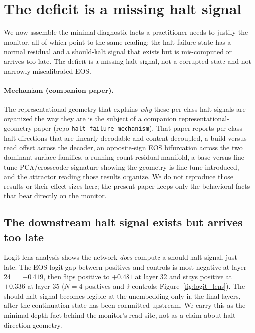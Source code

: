\documentclass[11pt]{article}
\begin{document}
\section{The deficit is a missing halt signal}
\label{sec:missinghalt}

We now assemble the minimal diagnostic facts a practitioner needs to justify the monitor,
all of which point to the same reading: the halt-failure state has a normal residual and a
should-halt signal that exists but is mis-computed or arrives too late. The deficit is a
missing halt signal, not a corrupted state and not narrowly-miscalibrated EOS.

\paragraph{Mechanism (companion paper).}
The representational geometry that explains \emph{why} these per-class halt signals are
organized the way they are is the subject of a companion representational-geometry paper
(repo \texttt{halt-failure-mechanism}). That paper reports per-class halt directions that
are linearly decodable and content-decoupled, a build-versus-read offset across the
decoder, an opposite-sign EOS bifurcation across the two dominant surface families, a
running-count residual manifold, a base-versus-fine-tune PCA/crosscoder signature showing
the geometry is fine-tune-introduced, and the attractor reading those results organize. We
do not reproduce those results or their effect sizes here; the present paper keeps only the
behavioral facts that bear directly on the monitor.

\subsection{The downstream halt signal exists but arrives too late}

Logit-lens analysis shows the network \emph{does} compute a should-halt signal, just late.
The EOS logit gap between positives and controls is most negative at layer 24 $= -0.419$,
then flips positive to $+0.481$ at layer 32 and stays positive at $+0.336$ at layer 35
($N=4$ positives and 9 controls; Figure~\ref{fig:logit_lens}). The should-halt signal
becomes legible at the unembedding only in the final layers, after the continuation state
has been committed upstream. We carry this as the minimal depth fact behind the monitor's
read site, not as a claim about halt-direction geometry.
\end{document}
